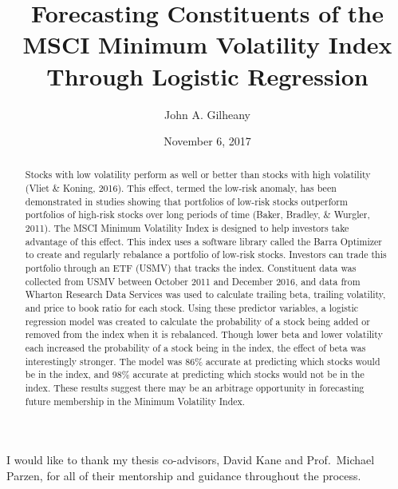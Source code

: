 \documentclass[12pt,twoside]{reedthesis}
\title{Forecasting Constituents of the MSCI Minimum Volatility Index Through
Logistic Regression}
\author{John A. Gilheany}
\date{November 6, 2017}
\theoremstyle{definition}
\theoremstyle{definition}
\theoremstyle{definition}
\theoremstyle{remark}
\begin{document}
  \maketitle

\frontmatter %
\pagestyle{empty} %
  \begin{acknowledgements}
    I would like to thank my thesis co-advisors, David Kane and
    Prof.~Michael Parzen, for all of their mentorship and guidance
    throughout the process.
  \end{acknowledgements}

  \hypersetup{linkcolor=black}
  \setcounter{tocdepth}{2}
  \tableofcontents

  \listoftables

  \listoffigures
  \begin{abstract}
    Stocks with low volatility perform as well or better than stocks with
    high volatility (Vliet \& Koning, 2016). This effect, termed the
    low-risk anomaly, has been demonstrated in studies showing that
    portfolios of low-risk stocks outperform portfolios of high-risk stocks
    over long periods of time (Baker, Bradley, \& Wurgler, 2011). The MSCI
    Minimum Volatility Index is designed to help investors take advantage of
    this effect. This index uses a software library called the Barra
    Optimizer to create and regularly rebalance a portfolio of low-risk
    stocks. Investors can trade this portfolio through an ETF (USMV) that
    tracks the index. Constituent data was collected from USMV between
    October 2011 and December 2016, and data from Wharton Research Data
    Services was used to calculate trailing beta, trailing volatility, and
    price to book ratio for each stock. Using these predictor variables, a
    logistic regression model was created to calculate the probability of a
    stock being added or removed from the index when it is rebalanced.
    Though lower beta and lower volatility each increased the probability of
    a stock being in the index, the effect of beta was interestingly
    stronger. The model was 86\% accurate at predicting which stocks would
    be in the index, and 98\% accurate at predicting which stocks would not
    be in the index. These results suggest there may be an arbitrage
    opportunity in forecasting future membership in the Minimum Volatility
    Index.
  \end{abstract}

\mainmatter %
\pagestyle{fancyplain} %
\end{document}

